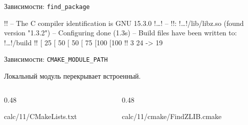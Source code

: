 \documentclass[compress, 8pt, aspectratio=169]{beamer}
\begin{document}
\begin{frame}[fragile]{Зависимости: \texttt{find\_package}}

  \begin{terminalwindow}
!!
-- The C compiler identification is GNU 15.3.0
!\dots!
-- !!: !\dots!/lib/libz.so (found version "1.3.2")
-- Configuring done (1.3s)
-- Build files have been written to: !\dots!/build
!!
[ 25%
[ 50%
[ 50%
[ 75%
[100%
[100%
!!
3 24 -> 19
  \end{terminalwindow}

\end{frame}

\begin{frame}[fragile]{Зависимости: \texttt{CMAKE\_MODULE\_PATH}}

  Локальный модуль перекрывает встроенный.

  \bigbreak

  \begin{columns}[T]

    \begin{column}{0.48\textwidth}

        {calc/11/CMakeLists.txt}

    \end{column}

    \begin{column}{0.48\textwidth}

        {calc/11/cmake/FindZLIB.cmake}

    \end{column}

  \end{columns}

\end{frame}
\end{document}
